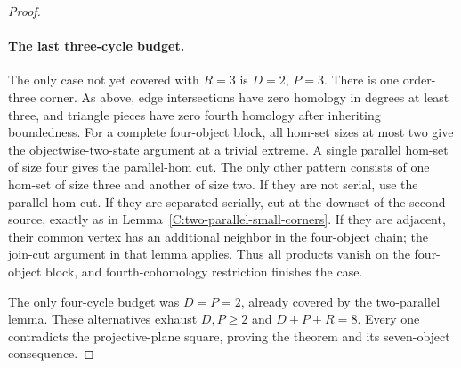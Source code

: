 \begin{proof}
\paragraph{The last three-cycle budget.}
The only case not yet covered with $R=3$ is
$D=2$, $P=3$.  There is one order-three corner.
As above, edge intersections have zero homology in
degrees at least three, and triangle pieces have zero
fourth homology after inheriting boundedness.
For a complete four-object block, all hom-set sizes
at most two give the objectwise-two-state argument
at a trivial extreme.  A single parallel hom-set
of size four gives the parallel-hom cut.
The only other pattern consists of one hom-set of
size three and another of size two.
If they are not serial, use the parallel-hom cut.
If they are separated serially, cut at the downset
of the second source, exactly as in
Lemma~\ref{C:two-parallel-small-corners}.
If they are adjacent, their common vertex has an
additional neighbor in the four-object chain;
the join-cut argument in that lemma applies.
Thus all products vanish on the four-object block,
and fourth-cohomology restriction finishes the case.

The only four-cycle budget was $D=P=2$, already
covered by the two-parallel lemma.  These alternatives
exhaust $D,P\geq2$ and $D+P+R=8$.
Every one contradicts the projective-plane square,
proving the theorem and its seven-object consequence.
\end{proof}
